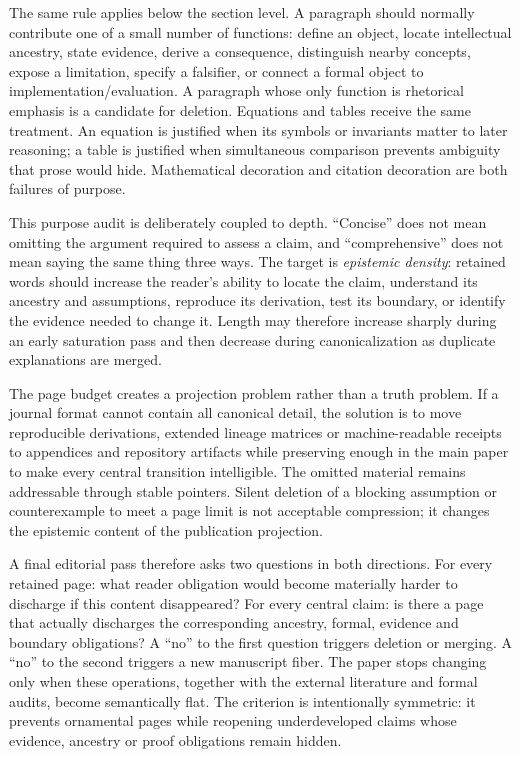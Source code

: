 The same rule applies below the section level. A paragraph should normally contribute one of a small number of functions: define an object, locate intellectual ancestry, state evidence, derive a consequence, distinguish nearby concepts, expose a limitation, specify a falsifier, or connect a formal object to implementation/evaluation. A paragraph whose only function is rhetorical emphasis is a candidate for deletion. Equations and tables receive the same treatment. An equation is justified when its symbols or invariants matter to later reasoning; a table is justified when simultaneous comparison prevents ambiguity that prose would hide. Mathematical decoration and citation decoration are both failures of purpose.

This purpose audit is deliberately coupled to depth. ``Concise'' does not mean omitting the argument required to assess a claim, and ``comprehensive'' does not mean saying the same thing three ways. The target is \emph{epistemic density}: retained words should increase the reader's ability to locate the claim, understand its ancestry and assumptions, reproduce its derivation, test its boundary, or identify the evidence needed to change it. Length may therefore increase sharply during an early saturation pass and then decrease during canonicalization as duplicate explanations are merged.

The page budget creates a projection problem rather than a truth problem. If a journal format cannot contain all canonical detail, the solution is to move reproducible derivations, extended lineage matrices or machine-readable receipts to appendices and repository artifacts while preserving enough in the main paper to make every central transition intelligible. The omitted material remains addressable through stable pointers. Silent deletion of a blocking assumption or counterexample to meet a page limit is not acceptable compression; it changes the epistemic content of the publication projection.

A final editorial pass therefore asks two questions in both directions. For every retained page: what reader obligation would become materially harder to discharge if this content disappeared? For every central claim: is there a page that actually discharges the corresponding ancestry, formal, evidence and boundary obligations? A ``no'' to the first question triggers deletion or merging. A ``no'' to the second triggers a new manuscript fiber. The paper stops changing only when these operations, together with the external literature and formal audits, become semantically flat. The criterion is intentionally symmetric: it prevents ornamental pages while reopening underdeveloped claims whose evidence, ancestry or proof obligations remain hidden.


